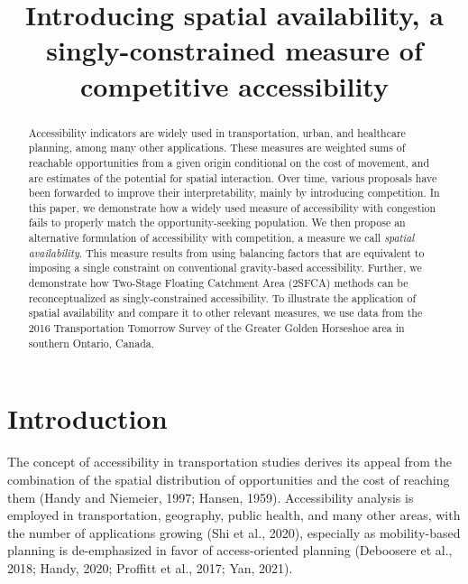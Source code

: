 \documentclass[]{elsarticle} %
\begin{document}
\begin{frontmatter}

  \title{Introducing spatial availability, a singly-constrained measure
of competitive accessibility}
      
  \begin{abstract}
  Accessibility indicators are widely used in transportation, urban, and
  healthcare planning, among many other applications. These measures are
  weighted sums of reachable opportunities from a given origin
  conditional on the cost of movement, and are estimates of the
  potential for spatial interaction. Over time, various proposals have
  been forwarded to improve their interpretability, mainly by
  introducing competition. In this paper, we demonstrate how a widely
  used measure of accessibility with congestion fails to properly match
  the opportunity-seeking population. We then propose an alternative
  formulation of accessibility with competition, a measure we call
  \emph{spatial availability}. This measure results from using balancing
  factors that are equivalent to imposing a single constraint on
  conventional gravity-based accessibility. Further, we demonstrate how
  Two-Stage Floating Catchment Area (2SFCA) methods can be
  reconceptualized as singly-constrained accessibility. To illustrate
  the application of spatial availability and compare it to other
  relevant measures, we use data from the 2016 Transportation Tomorrow
  Survey of the Greater Golden Horseshoe area in southern Ontario,
  Canada.
  \end{abstract}
  
 \end{frontmatter}

\newpage

\hypertarget{sec:introduction}{%
\section{Introduction}\label{sec:introduction}}

The concept of accessibility in transportation studies derives its
appeal from the combination of the spatial distribution of opportunities
and the cost of reaching them (Handy and Niemeier, 1997; Hansen, 1959).
Accessibility analysis is employed in transportation, geography, public
health, and many other areas, with the number of applications growing
(Shi et al., 2020), especially as mobility-based planning is
de-emphasized in favor of access-oriented planning (Deboosere et al.,
2018; Handy, 2020; Proffitt et al., 2017; Yan, 2021).
\end{document}
